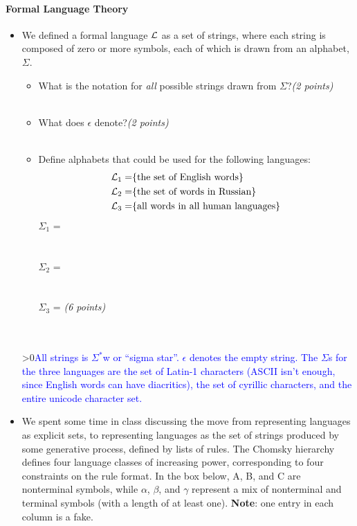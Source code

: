 \documentclass[12pt]{article}
\newcounter{showsolution}
\newcommand{\solution}[2]{\ifnum\value{showsolution}>0{\textcolor{blue}{#1}}\else{#2}\fi}
\begin{document}
\paragraph{Formal Language Theory}
\begin{itemize}

\item[1.] We defined a formal language $\cal{L}$ as a set of strings, where each string is composed of zero or more symbols, each of which is drawn from an alphabet, $\Sigma$.
\begin{itemize}
    \item[a.] What is the notation for \emph{all} possible strings drawn from $\Sigma$?\hfill{\em (2 points)}\\\\

    \item[b.] What does $\epsilon$ denote?\hfill{\em (2 points)}\\\\

    \item[c.] Define alphabets that could be used for the following languages:
    \begin{eqnarray*}
    {\cal L}_1 =& \{\textrm{the set of English words}\} \\
    {\cal L}_2 =& \{\textrm{the set of words in Russian}\} \\
    {\cal L}_3 =& \{\textrm{all words in all human languages}\}\\
    \end{eqnarray*}
    ${\Sigma}_1$ = \\\\ \\
    ${\Sigma}_2$ = \\\\\\
    ${\Sigma}_3$ = \hfill{\em (6 points)}\\\\\\
\end{itemize}

\solution{All strings is $\Sigma^*$w or ``sigma star''. $\epsilon$ denotes the empty string. The $\Sigma$s for the three languages are the set of Latin-1 characters (ASCII isn't enough, since English words can have diacritics), the set of cyrillic characters, and the entire unicode character set. \vspace{1cm}}

\newpage
\item[2.]
We spent some time in class discussing the move from representing languages as explicit sets, to representing languages as the set of strings produced by some generative process, defined by lists of rules. The Chomsky hierarchy defines four language classes of increasing power, corresponding to four constraints on the rule format. 
In the box below, A, B, and C are nonterminal symbols, while $\alpha$, $\beta$, and $\gamma$ represent a mix of nonterminal and terminal symbols (with a length of at least one). \textbf{Note}: one entry in each column is a fake.


\end{itemize}
\end{document}
